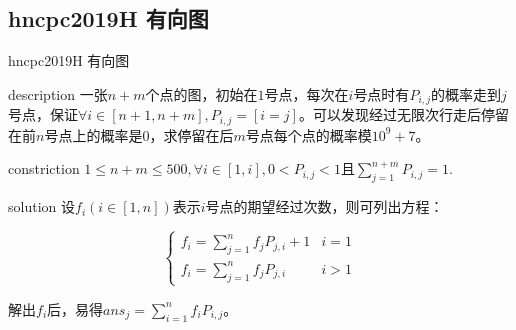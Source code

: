 \documentclass{beamer}
\begin{document}
	\subsection{hncpc2019H 有向图}
	\begin{frame}{hncpc2019H 有向图}
		\begin{block}{description}
			一张$n+m$个点的图，初始在$1$号点，每次在$i$号点时有$P_{i,j}$的概率走到$j$号点，保证$\forall i\in[n+1,n+m],P_{i,j}=[i=j]$。可以发现经过无限次行走后停留在前$n$号点上的概率是$0$，求停留在后$m$号点每个点的概率模$10^9+7$。
		\end{block}
		\begin{block}{constriction}
			$1 \le n+m \le 500, \forall i\in[1,i], 0 < P_{i,j} < 1$且$\sum_{j=1}^{n+m}P_{i,j}=1.$
		\end{block}
		\pause
		\begin{block}{solution}
			设$f_i(i\in[1,n])$表示$i$号点的期望经过次数，则可列出方程：
			
			$$\begin{cases}
			f_i=\sum_{j=1}^nf_jP_{j,i}+1&i=1\\
			f_i=\sum_{j=1}^nf_jP_{j,i}  &i>1
			\end{cases}$$
			
			解出$f_i$后，易得$ans_j=\sum_{i=1}^nf_iP_{i,j}$。
		\end{block}
		
	\end{frame}
\end{document}
